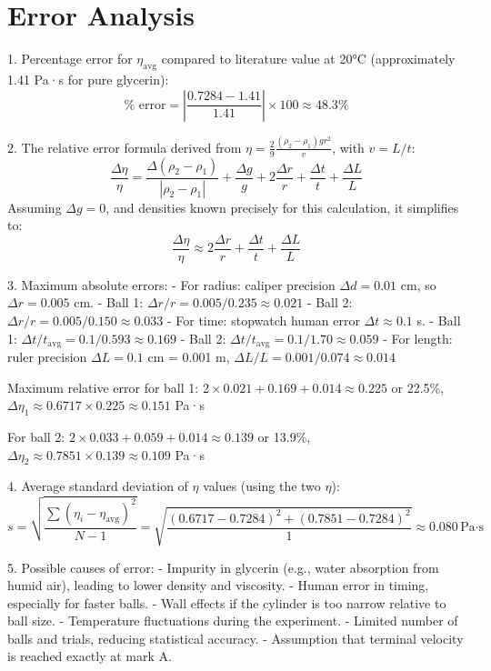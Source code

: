 \documentclass[12pt, a4paper]{article}
\begin{document}
\section{Error Analysis}
1. Percentage error for $\eta_{\text{avg}}$ compared to literature value at 20°C (approximately 1.41 Pa·s for pure glycerin):
\[ \% \text{ error} = \left| \frac{0.7284 - 1.41}{1.41} \right| \times 100 \approx 48.3\% \]

2. The relative error formula derived from $\eta = \frac{2}{9} \frac{(\rho_2 - \rho_1) g r^2}{v}$, with $v = L / t$:
\[ \frac{\Delta \eta}{\eta} = \frac{\Delta (\rho_2 - \rho_1)}{|\rho_2 - \rho_1|} + \frac{\Delta g}{g} + 2 \frac{\Delta r}{r} + \frac{\Delta t}{t} + \frac{\Delta L}{L} \]
Assuming $\Delta g = 0$, and densities known precisely for this calculation, it simplifies to:
\[ \frac{\Delta \eta}{\eta} \approx 2 \frac{\Delta r}{r} + \frac{\Delta t}{t} + \frac{\Delta L}{L} \]

3. Maximum absolute errors:
- For radius: caliper precision $\Delta d = 0.01$ cm, so $\Delta r = 0.005$ cm.
  - Ball 1: $\Delta r / r = 0.005 / 0.235 \approx 0.021$
  - Ball 2: $\Delta r / r = 0.005 / 0.150 \approx 0.033$
- For time: stopwatch human error $\Delta t \approx 0.1$ s.
  - Ball 1: $\Delta t / t_{\text{avg}} = 0.1 / 0.593 \approx 0.169$
  - Ball 2: $\Delta t / t_{\text{avg}} = 0.1 / 1.70 \approx 0.059$
- For length: ruler precision $\Delta L = 0.1$ cm = 0.001 m, $\Delta L / L = 0.001 / 0.074 \approx 0.014$

Maximum relative error for ball 1: $2 \times 0.021 + 0.169 + 0.014 \approx 0.225$ or 22.5\%, $\Delta \eta_1 \approx 0.6717 \times 0.225 \approx 0.151$ Pa·s

For ball 2: $2 \times 0.033 + 0.059 + 0.014 \approx 0.139$ or 13.9\%, $\Delta \eta_2 \approx 0.7851 \times 0.139 \approx 0.109$ Pa·s

4. Average standard deviation of $\eta$ values (using the two $\eta$):
\[ s = \sqrt{ \frac{ \sum (\eta_i - \eta_{\text{avg}})^2 }{N-1} } = \sqrt{ \frac{ (0.6717 - 0.7284)^2 + (0.7851 - 0.7284)^2 }{1} } \approx 0.080 \, \text{Pa·s} \]

5. Possible causes of error:
- Impurity in glycerin (e.g., water absorption from humid air), leading to lower density and viscosity.
- Human error in timing, especially for faster balls.
- Wall effects if the cylinder is too narrow relative to ball size.
- Temperature fluctuations during the experiment.
- Limited number of balls and trials, reducing statistical accuracy.
- Assumption that terminal velocity is reached exactly at mark A.
\end{document}
